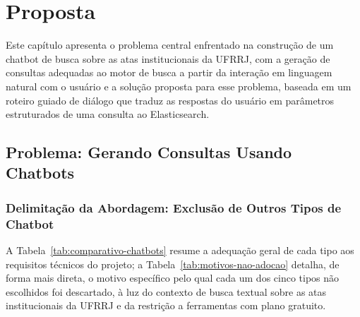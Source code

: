 \chapter{Proposta}\label{chp:PROPOSTA}

Este capítulo apresenta o problema central enfrentado na construção de um chatbot de busca sobre as atas institucionais da UFRRJ, com a geração de consultas adequadas ao motor de busca a partir da interação em linguagem natural com o usuário  e a solução proposta para esse problema, baseada em um roteiro guiado de diálogo que traduz as respostas do usuário em parâmetros estruturados de uma consulta ao Elasticsearch.

\section{Problema: Gerando Consultas Usando Chatbots}

\subsection{Delimitação da Abordagem: Exclusão de Outros Tipos de Chatbot}

A Tabela~\ref{tab:comparativo-chatbots} resume a adequação geral de cada tipo aos requisitos técnicos do projeto; a Tabela~\ref{tab:motivos-nao-adocao} detalha, de forma mais direta, o motivo específico pelo qual cada um dos cinco tipos não escolhidos foi descartado, à luz do contexto de busca textual sobre as atas institucionais da UFRRJ e da restrição a ferramentas com plano gratuito.


